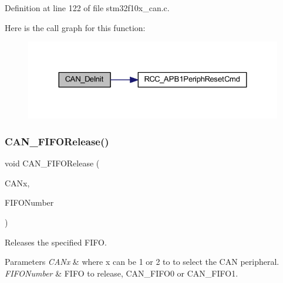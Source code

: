 Definition at line 122 of file stm32f10x\+\_\+can.\+c.

Here is the call graph for this function\+:
\nopagebreak
\begin{figure}[H]
\begin{center}
\leavevmode
\includegraphics[width=324pt]{group___c_a_n___exported___functions_ga002b74cd69574a14b17ad445090245cd_cgraph}
\end{center}
\end{figure}
\mbox{\label{group___c_a_n___exported___functions_ga1bc3b39471e579b4101624c33d27918b}} 
\subsubsection{\texorpdfstring{C\+A\+N\+\_\+\+F\+I\+F\+O\+Release()}{CAN\_FIFORelease()}}
{\footnotesize\ttfamily void C\+A\+N\+\_\+\+F\+I\+F\+O\+Release (\begin{DoxyParamCaption}\item[{\hyperlink{struct_c_a_n___type_def}{C\+A\+N\+\_\+\+Type\+Def} $\ast$}]{C\+A\+Nx,  }\item[{uint8\+\_\+t}]{F\+I\+F\+O\+Number }\end{DoxyParamCaption})}



Releases the specified F\+I\+FO. 


\begin{DoxyParams}{Parameters}
{\em C\+A\+Nx} & where x can be 1 or 2 to to select the C\+AN peripheral. \\
\hline
{\em F\+I\+F\+O\+Number} & F\+I\+FO to release, C\+A\+N\+\_\+\+F\+I\+F\+O0 or C\+A\+N\+\_\+\+F\+I\+F\+O1. \\
\hline
\end{DoxyParams}

